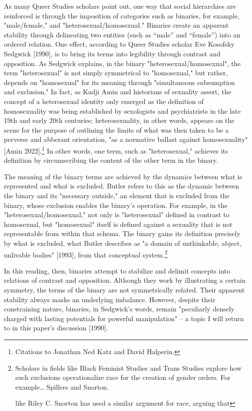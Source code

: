 \documentclass[11pt]{article}
\begin{document}
As many Queer Studies scholars point out, one way that social
hierarchies are reinforced is through the imposition of categories
such as binaries, for example, "male/female," and
"heterosexual/homosexual." Binaries create an apparent stability
through delineating two entities (such as “male” and “female”) into an
ordered relation. One effect, according to Queer Studies scholar Eve
Kosofsky Sedgwick [1990], is to bring its terms into legibility
through contrast and opposition. As Sedgwick explains, in the binary
"heterosexual/homosexual", the term "heterosexual" is not simply
symmetrical to "homosexual," but rather, depends on "homosexual" for
its meaning through "simultaneous subsumption and exclusion." In fact,
as Kadji Amin and historians of sexuality assert, the concept of a
heterosexual identity only emerged as the definition of homosexuality
was being established by sexologists and psychiatrists in the late
19th and early 20th centuries; heterosexuality, in other words,
appears on the scene for the purpose of outlining the limits of what
was then taken to be a perverse and abberant orientation, "as a
normative ballast against homosexuality" [Amin 2022].\footnote{Citations to Jonathan Ned Katz and David Halperin.} In other
words, one term, such as "heterosexual," achieves its definition by
circumscribing the content of the other term in the binary.

The meaning of the binary terms are achieved by the dynamics between
what is represented and what is excluded. Butler refers to this as the
dynamic between the binary and its "necessary outside," an element
that is excluded from the binary, whose exclusion enables the binary’s
operation. For example, in the "heterosexual/homosexual," not only is
"heterosexual" defined in contrast to homosexual, but "homosexual"
itself is defined against a sexuality that is not representable from
within that schema. The binary gains its definition precisely by what
is excluded, what Butler describes as "a domain of unthinkable,
abject, unlivable bodies" [1993], from that conceptual system.\footnote{Scholars in fields like Black Feminist Studies and Trans
Studies explore how such exclusions operationalize race for the
creation of gender orders. For example\ldots{} Spillers and Snorton.

like Riley C. Snorton has used a similar argument for race,
arguing that}

In this reading, then, binaries attempt to stabilize and delimit
concepts into relations of contrast and opposition. Although they work
by illustrating a certain symmetry, the terms of the binary are not
symmetrically related. Their apparent stability always masks an
underlying imbalance. However, despite their constraining nature,
binaries, in Sedgwick's words, remain "peculiarly densely charged with
lasting potentials for powerful manipulation" – a topic I will return
to in this paper's discussion [1990].
\end{document}
